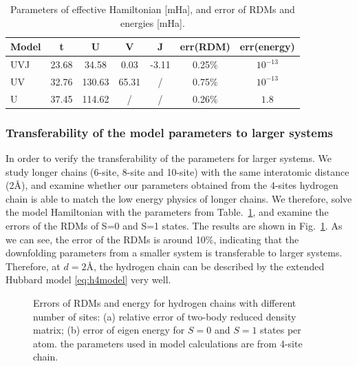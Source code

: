 \documentclass[aps, prb]{revtex4-1}
\begin{document}
\begin{table}[hbt]
\centering
\caption{Parameters of effective Hamiltonian [mHa], and error of RDMs and energies [mHa].}\label{tab:effm_hchain}
\begin{tabular}{||l|c|c|c|c||c|c||}
\hline
Model & t & U & V & J & err(RDM) & err(energy)\\
\hline
\hline
UVJ & 23.68 & 34.58 & 0.03 & -3.11 & 0.25\% & $10^{-13}$\\
UV & 32.76 & 130.63 & 65.31 & / & 0.75\% & $10^{-13}$\\
U & 37.45 & 114.62 & / & / & 0.26\% & $1.8$\\
\hline
\end{tabular}
\end{table}

\subsubsection{Transferability of the model parameters to larger systems} 
In order to verify the transferability of the parameters for larger systems. We study longer chains (6-site, 8-site and 10-site) with the same interatomic distance (2\AA), and examine whether our parameters obtained from the 4-sites hydrogen chain is able to match the low energy physics of longer chains. We therefore, solve the model Hamiltonian with the parameters
from Table.~\ref{tab:effm_hchain}, and examine the errors of the RDMs of S=0 and S=1 states. The results are
shown in Fig.~\ref{fig:h4transfer}. As we can see, the error of the RDMs is around 10\%, indicating that the downfolding parameters from a smaller system is transferable to larger systems.
Therefore, at $d=2$\AA, the hydrogen chain can be described by the extended Hubbard model \eqref{eq:h4model} very well. 
\begin{figure}[hbt]
\centering
{}
\caption{Errors of RDMs and energy for hydrogen chains with different number of sites: (a) relative error of two-body reduced density matrix; (b) error of eigen energy for $S=0$ and $S=1$ states per atom. the parameters used in model calculations are from 4-site chain.}\label{fig:h4transfer}
\end{figure}
\end{document}
